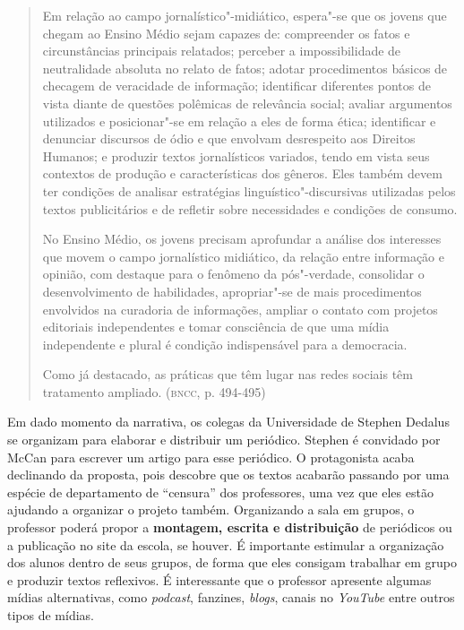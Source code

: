 \documentclass{article}
\begin{document}
\begin{quote}
Em relação ao campo jornalístico"-midiático, espera"-se que os jovens
que chegam ao Ensino Médio sejam capazes de: compreender os fatos e
circunstâncias principais relatados; perceber a impossibilidade de
neutralidade absoluta no relato de fatos; adotar procedimentos básicos
de checagem de veracidade de informação; identificar diferentes pontos
de vista diante de questões polêmicas de relevância social; avaliar
argumentos utilizados e posicionar"-se em relação a eles de forma ética;
identificar e denunciar discursos de ódio e que envolvam desrespeito aos
Direitos Humanos; e produzir textos jornalísticos variados, tendo em
vista seus contextos de produção e características dos gêneros. Eles
também devem ter condições de analisar estratégias
linguístico"-discursivas utilizadas pelos textos publicitários e de
refletir sobre necessidades e condições de consumo.

No Ensino Médio, os jovens precisam aprofundar a análise dos interesses
que movem o campo jornalístico midiático, da relação entre informação e
opinião, com destaque para o fenômeno da pós"-verdade, consolidar o
desenvolvimento de habilidades, apropriar"-se de mais procedimentos
envolvidos na curadoria de informações, ampliar o contato com projetos
editoriais independentes e tomar consciência de que uma mídia
independente e plural é condição indispensável para a democracia.

Como já destacado, as práticas que têm lugar nas redes sociais têm
tratamento ampliado. (\textsc{bncc}, p. 494-495)
\end{quote}

Em dado momento da narrativa, os colegas da Universidade de Stephen
Dedalus se organizam para elaborar e distribuir um periódico. Stephen
é convidado por McCan para escrever um artigo para esse periódico. O
protagonista acaba declinando da proposta, pois descobre que os textos
acabarão passando por uma espécie de departamento de ``censura'' dos
professores, uma vez que eles estão ajudando a organizar o projeto
também. Organizando a sala em grupos, o professor poderá propor a
\textbf{montagem, escrita e distribuição} de periódicos ou a
publicação no site da escola, se houver. É importante estimular a
organização dos alunos dentro de seus grupos, de forma que eles
consigam trabalhar em grupo e produzir textos reflexivos. É
interessante que o professor apresente algumas mídias alternativas,
como \emph{podcast}, fanzines, \emph{blogs}, canais no \emph{YouTube}
entre outros tipos de mídias.
\end{document}
